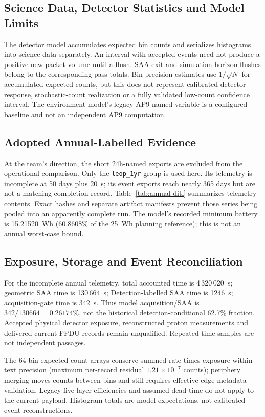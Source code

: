 \subsection{Science Data, Detector Statistics and Model Limits}\label{app:ditl-science}
The detector model accumulates expected bin counts and serializes histograms into science data separately. An interval with accepted events need not produce a positive new packet volume until a flush. SAA-exit and simulation-horizon flushes belong to the corresponding pass totals. Bin precision estimates use $1/\sqrt{N}$ for accumulated expected counts, but this does not represent calibrated detector response, stochastic-count realization or a fully validated low-count confidence interval. The environment model's legacy AP9-named variable is a configured baseline and not an independent AP9 computation.
\subsection{Adopted Annual-Labelled Evidence}\label{app:ditl-evidence}
At the team's direction, the short 24h-named exports are excluded from the operational comparison. Only the \texttt{leop\_1yr} group is used here. Its telemetry is incomplete at 50 days plus 20~s; its event exports reach nearly 365 days but are not a matching completion record. Table~\ref{tab:annual-ditl} summarizes telemetry contents. Exact hashes and separate artifact manifests prevent those series being pooled into an apparently complete run. The model's recorded minimum battery is 15.21520~Wh (60.8608\% of the 25~Wh planning reference); this is not an annual worst-case bound.

\subsection{Exposure, Storage and Event Reconciliation}
For the incomplete annual telemetry, total accounted time is 4\,320\,020~s; geometric SAA time is 130\,664~s; Detection-labelled SAA time is 1246~s; acquisition-gate time is 342~s. Thus model acquisition/SAA is $342/130664=0.26174\%$, not the historical detection-conditional 62.7\% fraction. Accepted physical detector exposure, reconstructed proton measurements and delivered current-FPDU records remain unqualified. Repeated time samples are not independent passages.

The 64-bin expected-count arrays conserve summed rate-times-exposure within text precision (maximum per-record residual $1.21\times10^{-7}$ counts); periphery merging moves counts between bins and still requires effective-edge metadata validation. Legacy five-layer efficiencies and assumed dead time do not apply to the current payload. Histogram totals are model expectations, not calibrated event reconstructions.

